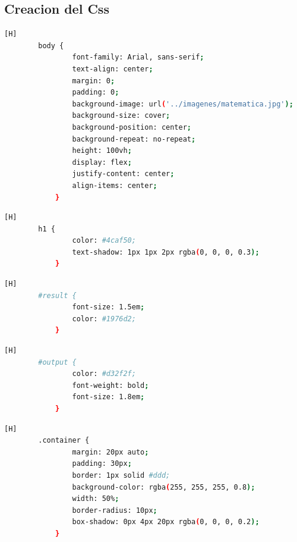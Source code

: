 \documentclass{article}
\begin{document}
	\subsection{Creacion del Css} 
        \begin{lstlisting}[language=bash,caption={Esta parte del código ayuda a crear un diseño limpio y centrado en la página.}][H]
		body {
                font-family: Arial, sans-serif;
                text-align: center;
                margin: 0;
                padding: 0;
                background-image: url('../imagenes/matematica.jpg');
                background-size: cover;
                background-position: center;
                background-repeat: no-repeat;
                height: 100vh;
                display: flex;
                justify-content: center;
                align-items: center;
            }
	\end{lstlisting}
	
	\begin{lstlisting}[language=bash,caption={Este estilo ayuda a que el encabezado sea más visualmente atractivo y legible.}][H]
		h1 {
                color: #4caf50;
                text-shadow: 1px 1px 2px rgba(0, 0, 0, 0.3);
            }
	\end{lstlisting}
	\begin{lstlisting}[language=bash,caption={Establece el tamaño de la fuente y define el color del texto.}][H]
		#result {
                font-size: 1.5em;
                color: #1976d2;
            }

	\end{lstlisting}
	\begin{lstlisting}[language=bash,caption={Establece el color del texto en un rojo intenso, hace que el texto sea negrita y aumenta el tamaño de la fuente}][H]
		#output {
                color: #d32f2f;
                font-weight: bold;
                font-size: 1.8em;
            }

	\end{lstlisting}
	
	\begin{lstlisting}[language=bash,caption={Le da un estilo al contenedor principal}][H]
		.container {
                margin: 20px auto;
                padding: 30px;
                border: 1px solid #ddd;
                background-color: rgba(255, 255, 255, 0.8);
                width: 50%;
                border-radius: 10px;
                box-shadow: 0px 4px 20px rgba(0, 0, 0, 0.2);
            }
	\end{lstlisting}
	
\end{document}
